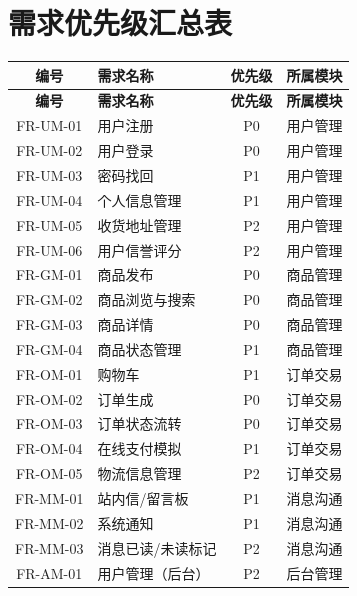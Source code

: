 \documentclass[12pt,a4paper,UTF8]{ctexart}
\begin{document}
\newpage
\appendix
\section{需求优先级汇总表}

\begin{longtable}{|c|p{}|c|p{}|}
    \hline
    \textbf{编号} & \textbf{需求名称} & \textbf{优先级} & \textbf{所属模块} \\
    \hline
    \endfirsthead
    \hline
    \textbf{编号} & \textbf{需求名称} & \textbf{优先级} & \textbf{所属模块} \\
    \hline
    \endhead
    \hline
    \endfoot

    FR-UM-01 & 用户注册 & P0 & 用户管理 \\
    \hline
    FR-UM-02 & 用户登录 & P0 & 用户管理 \\
    \hline
    FR-UM-03 & 密码找回 & P1 & 用户管理 \\
    \hline
    FR-UM-04 & 个人信息管理 & P1 & 用户管理 \\
    \hline
    FR-UM-05 & 收货地址管理 & P2 & 用户管理 \\
    \hline
    FR-UM-06 & 用户信誉评分 & P2 & 用户管理 \\
    \hline
    FR-GM-01 & 商品发布 & P0 & 商品管理 \\
    \hline
    FR-GM-02 & 商品浏览与搜索 & P0 & 商品管理 \\
    \hline
    FR-GM-03 & 商品详情 & P0 & 商品管理 \\
    \hline
    FR-GM-04 & 商品状态管理 & P1 & 商品管理 \\
    \hline
    FR-OM-01 & 购物车 & P1 & 订单交易 \\
    \hline
    FR-OM-02 & 订单生成 & P0 & 订单交易 \\
    \hline
    FR-OM-03 & 订单状态流转 & P0 & 订单交易 \\
    \hline
    FR-OM-04 & 在线支付模拟 & P1 & 订单交易 \\
    \hline
    FR-OM-05 & 物流信息管理 & P2 & 订单交易 \\
    \hline
    FR-MM-01 & 站内信/留言板 & P1 & 消息沟通 \\
    \hline
    FR-MM-02 & 系统通知 & P1 & 消息沟通 \\
    \hline
    FR-MM-03 & 消息已读/未读标记 & P2 & 消息沟通 \\
    \hline
    FR-AM-01 & 用户管理（后台） & P2 & 后台管理 \\

\end{longtable}
\end{document}
